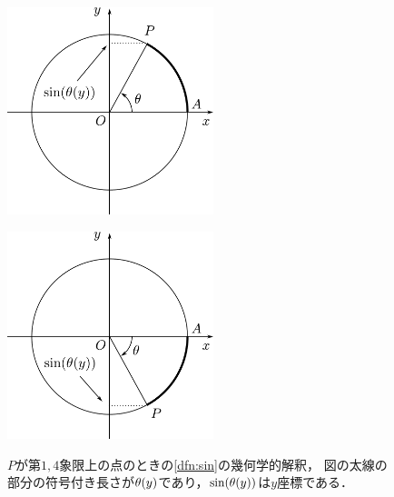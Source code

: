 \documentclass[11pt,a4paper]{ltjsarticle}
\theoremstyle{definition}
\begin{document}
\begin{figure}[htbp]
  \begin{minipage}{.45\linewidth}
    \centering
    \includegraphics[width=60mm]{fig/circle.pdf}
    \label{fig:circleposi}
  \end{minipage}
  \begin{minipage}{.45\linewidth}
    \centering
    \includegraphics[width=60mm]{fig/circlenega.pdf}
    \label{fig:circlenega}
  \end{minipage}
  \caption{$P$が第$1,4$象限上の点のときの\cref{dfn:sin}の幾何学的解釈，
  図の太線の部分の符号付き長さが$\apply{\theta}{y}$であり，$\apply{\sin}{\apply{\theta}{y}}$は$y$座標である．}
  \label{fig:circle}
\end{figure}
\end{document}
